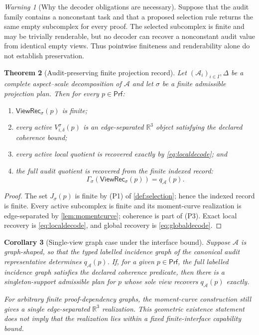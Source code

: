 \documentclass[11pt]{article}
\newcommand{\R}{\mathbb R}
\newcommand{\Prf}{\mathsf{Prf}}
\newcommand{\qA}{q_{\mathcal A}}
\newcommand{\mcA}{\mathcal A}
\newcommand{\ViewRec}{\ensuremath{\mathsf{ViewRec}}}
\theoremstyle{plain}
\newtheorem{theorem}{Theorem}[section]
\newtheorem{corollary}[theorem]{Corollary}
\theoremstyle{definition}
\theoremstyle{remark}
\newtheorem{warning}[theorem]{Warning}
\begin{document}
\begin{warning}[Why the decoder obligations are necessary]
\label{warn:decoder}
Suppose that the audit family contains a nonconstant task and that a proposed
selection rule returns the same empty subcomplex for every proof.  The selected
subcomplex is finite and may be trivially renderable, but no decoder can recover
a nonconstant audit value from identical empty views.  Thus pointwise finiteness
and renderability alone do not establish preservation.
\end{warning}

\begin{theorem}[Audit-preserving finite projection record]
\label{thm:family-preservation}
Let $(\mcA_i)_{i\in I},\Delta$ be a complete aspect--scale decomposition of
$\mcA$ and let $\sigma$ be a finite admissible projection plan.  Then for every
$p\in\Prf$:
\begin{enumerate}[label=\textnormal{(\roman*)},leftmargin=2.6em]
\item $\ViewRec_\sigma(p)$ is finite;
\item every active $V^\sigma_{i,\delta}(p)$ is an edge-separated
$\R^3$ object satisfying the declared coherence bound;
\item every active local quotient is recovered exactly by
\eqref{eq:localdecode}; and
\item the full audit quotient is recovered from the finite indexed record:
\[
  \Gamma_\sigma(\ViewRec_\sigma(p))=\qA(p).
\]
\end{enumerate}
\end{theorem}

\begin{proof}
The set $J_\sigma(p)$ is finite by \textnormal{(P1)} of
\cref{def:selection}; hence the indexed record is finite.  Every active
subcomplex is finite and its moment-curve realization is edge-separated by
\cref{lem:momentcurve}; coherence is part of \textnormal{(P3)}.  Exact local
recovery is \eqref{eq:localdecode}, and global recovery is
\eqref{eq:globaldecode}.
\end{proof}

\begin{corollary}[Single-view graph case under the interface bound]
\label{cor:single-view}
Suppose $\mcA$ is graph-shaped, so that the typed labelled incidence graph of
the canonical audit representative determines $\qA(p)$.  If, for a given
$p\in\Prf$, the full labelled incidence graph satisfies the declared coherence
predicate, then there is a singleton-support admissible plan for $p$ whose sole
view recovers $\qA(p)$ exactly.

For arbitrary finite proof-dependency graphs, the moment-curve construction
still gives a single edge-separated $\R^3$ realization.  This geometric
existence statement does not imply that the realization lies within a fixed
finite-interface capability bound.
\end{corollary}
\end{document}
